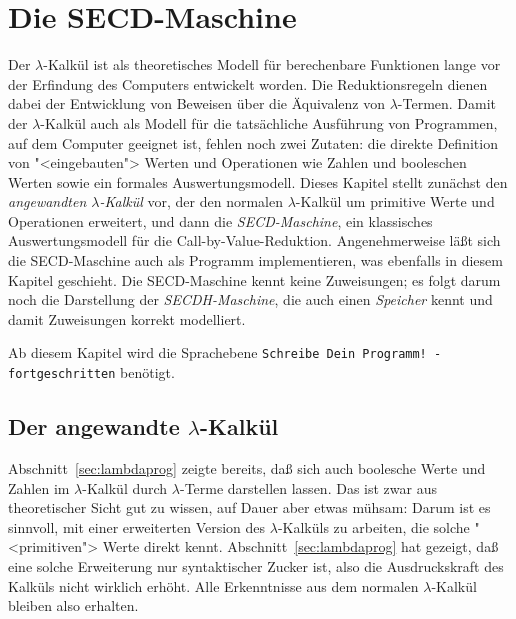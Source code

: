 
\chapter{Die SECD-Maschine}\label{cha:secd}

Der $\lambda$-Kalkül ist als theoretisches Modell für berechenbare
Funktionen lange vor der Erfindung des Computers entwickelt worden.
Die Reduktionsregeln dienen dabei der Entwicklung von Beweisen über
die Äquivalenz von $\lambda$-Termen.  Damit der $\lambda$-Kalkül auch
als Modell für die tatsächliche Ausführung von Programmen, auf dem
Computer geeignet ist, fehlen noch zwei Zutaten: die direkte
Definition von "<eingebauten"> Werten und Operationen wie Zahlen und
booleschen Werten sowie ein formales Auswertungsmodell.  Dieses
Kapitel stellt zunächst den \textit{angewandten $\lambda$-Kalkül} vor,
der den normalen $\lambda$-Kalkül um primitive Werte und Operationen
erweitert, und dann die \textit{SECD-Maschine}, ein klassisches
Auswertungsmodell für die Call-by-Value-Reduktion.  Angenehmerweise
läßt sich die SECD-Maschine auch als Programm implementieren,
was ebenfalls in diesem Kapitel geschieht.  Die SECD-Maschine
kennt keine Zuweisungen; es folgt darum noch die Darstellung der
\textit{SECDH-Maschine}, die auch einen \textit{Speicher} kennt und
damit Zuweisungen korrekt modelliert.

Ab diesem Kapitel wird die Sprachebene \texttt{Schreibe
  Dein Programm! - fortgeschritten} benötigt. 

\section{Der angewandte $\lambda$-Kalkül}

Abschnitt~\ref{sec:lambdaprog} zeigte bereits, daß sich auch boolesche
Werte und Zahlen im $\lambda$-Kalkül durch $\lambda$-Terme darstellen
lassen.  Das ist zwar aus theoretischer Sicht gut zu wissen, auf Dauer
aber etwas mühsam: Darum ist es sinnvoll, mit einer erweiterten
Version des $\lambda$-Kalküls zu arbeiten, die solche "<primitiven">
Werte direkt kennt.  Abschnitt~\ref{sec:lambdaprog} hat gezeigt,
daß eine solche Erweiterung nur syntaktischer Zucker ist,
also die Ausdruckskraft des Kalküls nicht wirklich erhöht.  Alle
Erkenntnisse aus dem normalen $\lambda$-Kalkül bleiben also erhalten.

